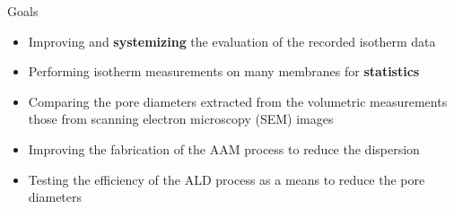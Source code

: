 \documentclass[../defence.tex]{subfiles}
\begin{document}
  \begin{frame}{Goals}
    \begin{itemize}
      \item Improving and \textbf{systemizing} the evaluation of the recorded isotherm data
      \pause

      \item Performing isotherm measurements on many membranes for \textbf{statistics}
      \pause

      \item Comparing the pore diameters extracted from the volumetric measurements those from scanning electron microscopy (SEM) images
      \pause

      \item Improving the fabrication of the AAM process to reduce the dispersion
      \pause

      \item Testing the efficiency of the ALD process as a means to reduce the pore diameters
    \end{itemize}
  \end{frame}
\end{document}
